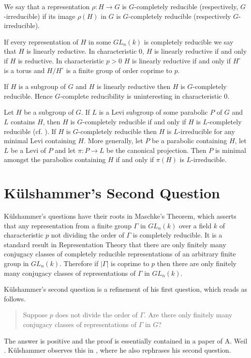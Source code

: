 We say that a representation $\rho:H\rightarrow G$ is $G$-completely reducible (respectively, $G$-irreducible) if its image $\rho(H)$ in $G$ is $G$-completely reducible (respectively $G$-irreducible).

If every representation of $H$ in some $GL_n(k)$ is completely reducible we say that $H$ is linearly reductive. In characteristic 0, $H$ is linearly reductive if and only if $H$ is reductive. In characteristic $p>0$ $H$ is linearly reductive if and only if $H^\circ$ is a torus and $H/H^\circ$ is a finite group of order coprime to $p$.

If $H$ is a subgroup of $G$ and $H$ is linearly reductive then $H$ is $G$-completely reducible. Hence $G$-complete reducibility is uninteresting in characteristic 0.

Let $H$ be a subgroup of $G$. If $L$ is a Levi subgroup of some parabolic $P$ of $G$ and $L$ contains $H$, then $H$ is $G$-completely reducible if and only if $H$ is $L$-completely reducible (cf. \cite[Theorem 3.1]{bate2005geometric}). If $H$ is $G$-completely reducible then $H$ is $L$-irreducible for any minimal Levi containing $H$. More generally, let $P$ be a parabolic containing $H$, let $L$ be a Levi of $P$ and let $\pi:P\rightarrow L$ be the canonical projection. Then $P$ is minimal amongst the parabolics containing $H$ if and only if $\pi(H)$ is $L$-irreducible.

\section{K\"ulshammer's Second Question}

K\"ulshammer's questions have their roots in Maschke's Theorem, which asserts that any representation from a finite group $\Gamma$ in $GL_n(k)$ over a field $k$ of characteristic $p$ not dividing the order of $\Gamma$ is completely reducible.
It is a standard result in Representation Theory that there are only finitely many conjugacy classes of completely reducible representations of an arbitrary finite group in $GL_n(k)$. Therefore if $|\Gamma|$ is coprime to $p$ then there are only finitely many conjugacy classes of representations of $\Gamma$ in $GL_n(k)$.

K\"ulshammer's second question is a refinement of his first question, which reads as follows.
\begin{quote}
  Suppose $p$ does not divide the order of $\Gamma$. Are there only finitely many conjugacy classes of representations of $\Gamma$ in $G$?
\end{quote}
The answer is positive and the proof is essentially contained in a paper of A. Weil \cite{weil1964remarks}. K\"ulshammer observes this in \cite{kulshammer1995donovan}, where he also rephrases his second question.

